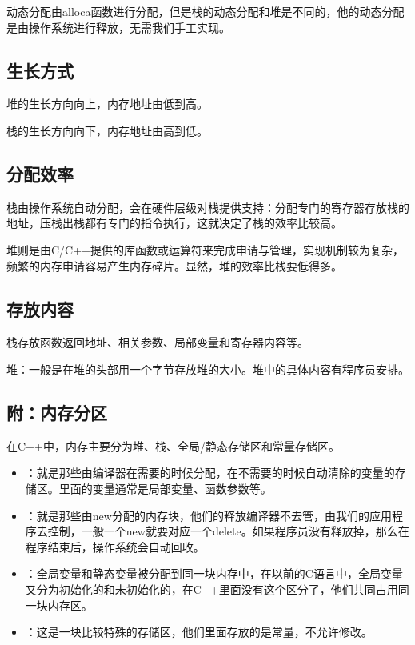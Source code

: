 \documentclass[letterpaper,10pt,english]{sphinxmanual}
\begin{document}
动态分配由alloca函数进行分配，但是栈的动态分配和堆是不同的，他的动态分配是由操作系统进行释放，无需我们手工实现。


\subsection{生长方式}
\label{\detokenize{cpp/11_heapStack:id5}}
堆的生长方向向上，内存地址由低到高。

栈的生长方向向下，内存地址由高到低。


\subsection{分配效率}
\label{\detokenize{cpp/11_heapStack:id6}}
栈由操作系统自动分配，会在硬件层级对栈提供支持：分配专门的寄存器存放栈的地址，压栈出栈都有专门的指令执行，这就决定了栈的效率比较高。

堆则是由C/C++提供的库函数或运算符来完成申请与管理，实现机制较为复杂，频繁的内存申请容易产生内存碎片。显然，堆的效率比栈要低得多。


\subsection{存放内容}
\label{\detokenize{cpp/11_heapStack:id7}}
栈存放函数返回地址、相关参数、局部变量和寄存器内容等。

堆：一般是在堆的头部用一个字节存放堆的大小。堆中的具体内容有程序员安排。


\subsection{附：内存分区}
\label{\detokenize{cpp/11_heapStack:id8}}
在C++中，内存主要分为堆、栈、全局/静态存储区和常量存储区。
\begin{itemize}
\item {} 
 ：就是那些由编译器在需要的时候分配，在不需要的时候自动清除的变量的存储区。里面的变量通常是局部变量、函数参数等。

\item {} 
 ：就是那些由new分配的内存块，他们的释放编译器不去管，由我们的应用程序去控制，一般一个new就要对应一个delete。如果程序员没有释放掉，那么在程序结束后，操作系统会自动回收。

\item {} 
 ：全局变量和静态变量被分配到同一块内存中，在以前的C语言中，全局变量又分为初始化的和未初始化的，在C++里面没有这个区分了，他们共同占用同一块内存区。

\item {} 
 ：这是一块比较特殊的存储区，他们里面存放的是常量，不允许修改。

\end{itemize}
\end{document}
